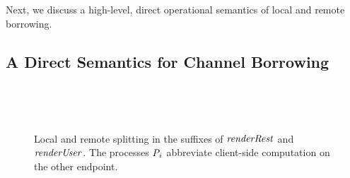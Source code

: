 Next, we discuss a high-level, direct operational semantics of local and remote borrowing.


\subsection{A Direct Semantics for Channel Borrowing}
\label{sec:direct-semant-chann}

\begin{Listing}
  \TightCode
  \linenoon
  \setlength\linenowidth{1em}
  \setlength\commentindent{.75em}
  \setlength\blanklineskip{\medskipamount}
  \begin{minipage}[t]{.48\linewidth}
    \linenoreset
    \CodeRenderRestElab
  \end{minipage}\hfill
  \begin{minipage}[t]{.48\linewidth}
    \linenoreset
    \CodeRenderUserElab
  \end{minipage}\\
  \begin{subcaptiongroup}
    \parbox{.48\linewidth}{%
      \caption{The translation of \ensuremath{\Varid{renderRest}} uses \ensuremath{\CodeOp{lsplit}}. The concatenated
        type of \ensuremath{\Varid{c}_{1}} and \ensuremath{\Varid{c}_{2}} is equal to the original type of \ensuremath{\Varid{c}}.}
      \label{fig:rendering-example-elab/local}}\hfill
    \parbox{.48\linewidth}{%
      \caption{The translation of \ensuremath{\Varid{renderUser}} uses \ensuremath{\CodeOp{rsplit}}. Proper synchronization
        between \ensuremath{\Varid{c}_{1}} and \ensuremath{\Varid{c}_{2}} is ensured by the additional \ensuremath{\CodeTy{Drop}} and \ensuremath{\CodeTy{Acq}}
        session types.}
      \label{fig:rendering-example-elab/remote}}%
  \end{subcaptiongroup}
  \caption{Snippets of the rendering example elaborated to explicit split operations}
  \label{fig:rendering-example-elab}
\end{Listing}

\begin{figure}
  \TightCode
  \begin{minipage}[t]{0.48\linewidth}
    \LocalSplitReduction
  \end{minipage}\hfill
  \begin{minipage}[t]{0.48\linewidth}
    \RemoteSplitReduction
  \end{minipage}\\
  \begin{subcaptiongroup}
    \parbox{.49\linewidth}{%
      \caption{Local split reduction suffix}
      \label{fig:local-split-trace}}\hfill
    \parbox{.48\linewidth}{%
      \caption{Remote split and acquire reduction suffix}
      \label{fig:remote-split-trace}}%
  \end{subcaptiongroup}
  \caption{Local and remote splitting in the suffixes of \ensuremath{\Varid{renderRest}} and
    \ensuremath{\Varid{renderUser}}. The processes \ensuremath{\Varid{P}_i} abbreviate client-side computation on the
    other endpoint.}
  \label{fig:local-split-reduction}
\end{figure}

